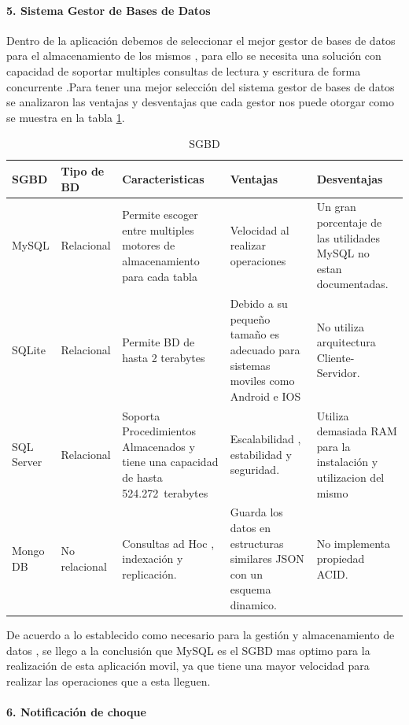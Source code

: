 \paragraph{5. Sistema Gestor de Bases de Datos} 
Dentro de la aplicación debemos de seleccionar el mejor gestor de bases de datos para el almacenamiento de los mismos , para ello se necesita una solución con capacidad de soportar multiples consultas de lectura y escritura de forma concurrente .Para tener una mejor selección del sistema gestor de bases de datos se analizaron las ventajas y desventajas que cada gestor nos puede otorgar como se muestra en la tabla \ref{disenoEstructura:SGBD}.
\begin{table}[h!]
\begin{tabular}{|p{3cm}|p{3.5cm}|p{3cm}|p{3cm}|p{3cm}|}
\hline
\textbf{SGBD}&\textbf{Tipo de BD}& \textbf{Caracteristicas}& \textbf{Ventajas} & \textbf{Desventajas} \\
\hline
\hline
MySQL & Relacional & Permite escoger entre multiples motores de almacenamiento para cada tabla & Velocidad al realizar operaciones & Un gran porcentaje de las utilidades MySQL no estan documentadas. \\
\hline
\hline
SQLite & Relacional & Permite BD de hasta 2 terabytes & Debido a su pequeño tamaño es adecuado para sistemas moviles como Android e IOS & No utiliza arquitectura Cliente-Servidor. \\
\hline
\hline
SQL Server & Relacional & Soporta Procedimientos Almacenados y tiene una capacidad de hasta 524.272 terabytes & Escalabilidad , estabilidad y seguridad. & Utiliza demasiada RAM para la instalación y utilizacion del mismo \\
\hline
\hline
Mongo DB & No relacional & Consultas ad Hoc , indexación y replicación. &Guarda los datos en estructuras similares JSON con un esquema dinamico.& No implementa propiedad ACID. \\
\hline

\end{tabular}
\caption{SGBD}
\label{disenoEstructura:SGBD}
\end{table}

De acuerdo a lo establecido como necesario para la gestión y almacenamiento de datos , se llego a la conclusión que MySQL es el SGBD mas optimo para la realización de esta aplicación movil, ya que tiene una mayor velocidad para realizar las operaciones que a esta lleguen. 

\paragraph{6. Notificación de choque} 

